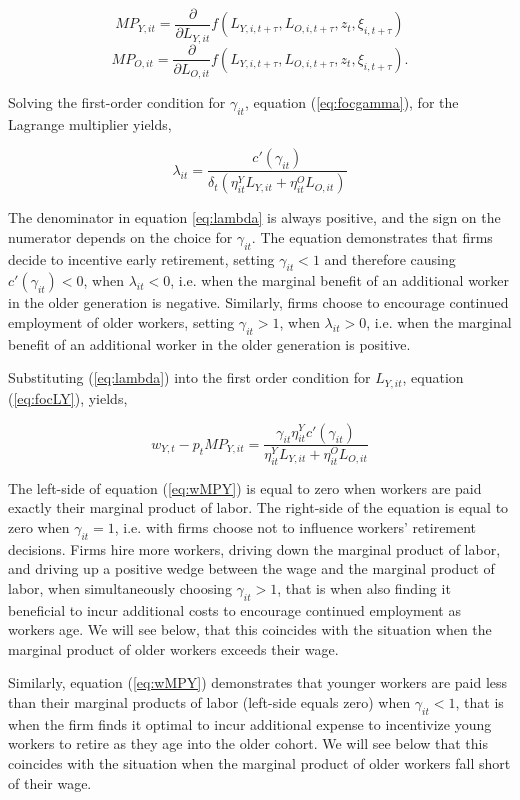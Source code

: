 \documentclass[11pt]{article}
\newcommand{\beq}{\begin{equation}}
\newcommand{\eeq}{\end{equation}}
\begin{document}
\beq \label{eq:MPY} MP_{Y,it} = \frac{\partial}{\partial L_{Y,it}} f\left(L_{Y,i,t+\tau}, L_{O,i,t+\tau}, z_t, \xi_{i,t+\tau} \right) \eeq
\beq \label{eq:MPO} MP_{O,it} = \frac{\partial}{\partial L_{O,it}} f\left(L_{Y,i,t+\tau}, L_{O,i,t+\tau}, z_t, \xi_{i,t+\tau} \right).  \eeq

Solving the first-order condition for $\gamma_{it}$, equation (\ref{eq:focgamma}), for the Lagrange multiplier yields,

\beq \label{eq:lambda} \lambda_{it} = \frac{c'(\gamma_{it})}{\delta_{t} \left( \eta^Y_{it} L_{Y,it} +  \eta^O_{it} L_{O,it} \right) } \eeq

The denominator in equation \ref{eq:lambda} is always positive, and the sign on the numerator depends on the choice for $\gamma_{it}$. The equation demonstrates that firms decide to incentive early retirement, setting $\gamma_{it}<1$ and therefore causing $c'(\gamma_{it})<0$, when $\lambda_{it}<0$, i.e. when the marginal benefit of an additional worker in the older generation is negative. Similarly, firms choose to encourage continued employment of older workers, setting $\gamma_{it}>1$, when $\lambda_{it}>0$, i.e. when the marginal benefit of an additional worker in the older generation is positive.

Substituting (\ref{eq:lambda}) into the first order condition for $L_{Y,it}$, equation (\ref{eq:focLY}), yields,

\beq \label{eq:wMPY} w_{Y,t} - p_t MP_{Y,it} = \frac{\gamma_{it} \eta_{it}^Y c'(\gamma_{it})}{\eta_{it}^Y L_{Y,it} + \eta_{it}^O L_{O,it}} \eeq

The left-side of equation (\ref{eq:wMPY}) is equal to zero when workers are paid exactly their marginal product of labor. The right-side of the equation is equal to zero when $\gamma_{it}=1$, i.e. with firms choose not to influence workers' retirement decisions. Firms hire more workers, driving down the marginal product of labor, and driving up a positive wedge between the wage and the marginal product of labor, when simultaneously choosing $\gamma_{it}>1$, that is when also finding it beneficial to incur additional costs to encourage continued employment as workers age. We will see below, that this coincides with the situation when the marginal product of older workers exceeds their wage.

Similarly, equation (\ref{eq:wMPY}) demonstrates that younger workers are paid less than their marginal products of labor (left-side equals zero) when $\gamma_{it}<1$, that is when the firm finds it optimal to incur additional expense to incentivize young workers to retire as they age into the older cohort. We will see below that this coincides with the situation when the marginal product of older workers fall short of their wage. 
\end{document}
